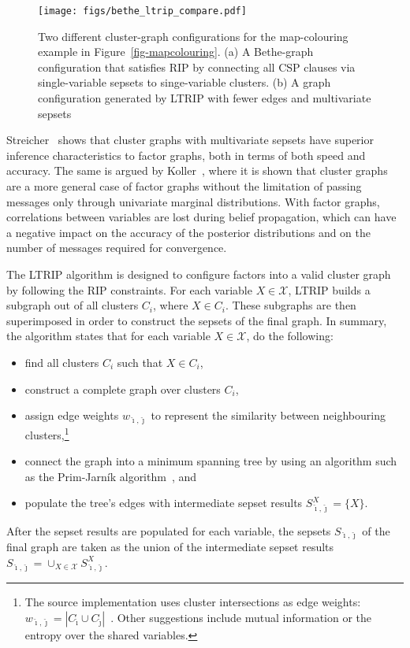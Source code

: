 \documentclass{ieeeaccess}
\begin{document}
\begin{figure}[h]
	\centering
	\texttt{[image: figs/bethe\_ltrip\_compare.pdf]}
	\caption{Two different cluster-graph configurations for the map-colouring example in Figure~\ref{fig-mapcolouring}. (a) A Bethe-graph configuration that satisfies RIP by connecting all CSP clauses via single-variable sepsets to singe-variable clusters. (b) A graph configuration generated by LTRIP with fewer edges and multivariate sepsets}
	\label{fig:betheltrip}
\end{figure}

Streicher~\cite{streicher} shows that cluster graphs with multivariate sepsets have superior inference characteristics to factor graphs, both in terms of both speed and accuracy. The same is argued by Koller~\cite[Sec. 11.3.5.3]{koller}, where it is shown that cluster graphs are a more general case of factor graphs without the limitation of passing messages only through univariate marginal distributions. With factor graphs, correlations between variables are lost during belief propagation, which can have a negative impact on the accuracy of the posterior distributions and on the number of messages required for convergence.


The LTRIP algorithm is designed to configure factors into a valid cluster graph by following the RIP constraints. For each variable $X \in \mathcal{X}$, LTRIP builds a subgraph out of all clusters $C_i$, where $X \in C_i$. These subgraphs are then superimposed in order to construct the sepsets of the final graph. In summary, the algorithm states that for each variable $X \in \mathcal{X}$, do the following:
\begin{itemize}
	\item find all clusters $C_i$ such that $X \in C_i$,
	\item construct a complete graph over clusters $C_i$,
	\item assign edge weights $w_{\hat{\imath}, \hat{\jmath}}$ to represent the similarity between neighbouring clusters,\footnote{The source implementation uses cluster intersections as edge weights: $w_{\hat{\imath}, \hat{\jmath}} = |C_{\hat{\imath}} \cup C_{\hat{\jmath}}|$~\cite{streicher}. Other suggestions include mutual information or the entropy over the shared variables.}
	\item connect the graph into a minimum spanning tree by using an algorithm such as the Prim-Jarn\'{i}k algorithm~\cite{prim}, and
	\item populate the tree's edges with intermediate sepset results $S^X_{\hat{\imath}, \hat{\jmath}} = \{X\}$.
\end{itemize}
After the sepset results are populated for each variable, the sepsets $S_{\hat{\imath}, \hat{\jmath}}$ of the final graph are taken as the union of the intermediate sepset results  $S_{\hat{\imath}, \hat{\jmath}} = \cup_{X \in \mathcal{X}} S^X_{\hat{\imath}, \hat{\jmath}}$.
\end{document}
